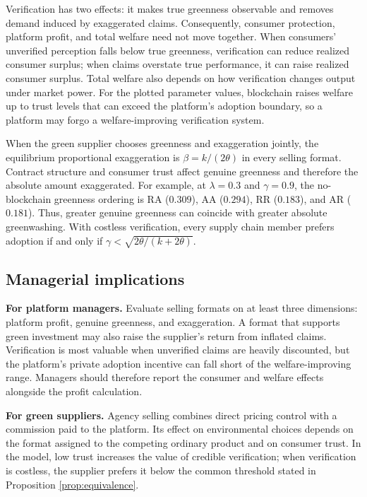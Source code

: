 \documentclass[preprint,review,12pt,authoryear,nopreprintline]{elsarticle}
\theoremstyle{definition}
\begin{document}
Verification has two effects: it makes true greenness observable and removes demand induced by exaggerated claims. Consequently, consumer protection, platform profit, and total welfare need not move together. When consumers' unverified perception falls below true greenness, verification can reduce realized consumer surplus; when claims overstate true performance, it can raise realized consumer surplus. Total welfare also depends on how verification changes output under market power. For the plotted parameter values, blockchain raises welfare up to trust levels that can exceed the platform's adoption boundary, so a platform may forgo a welfare-improving verification system.

When the green supplier chooses greenness and exaggeration jointly, the equilibrium proportional exaggeration is $\beta=k/(2\theta)$ in every selling format. Contract structure and consumer trust affect genuine greenness and therefore the absolute amount exaggerated. For example, at $\lambda=0.3$ and $\gamma=0.9$, the no-blockchain greenness ordering is RA ($0.309$), AA ($0.294$), RR ($0.183$), and AR ($0.181$). Thus, greater genuine greenness can coincide with greater absolute greenwashing. With costless verification, every supply chain member prefers adoption if and only if $\gamma<\sqrt{2\theta/(k+2\theta)}$.

\subsection{Managerial implications}

\textbf{For platform managers.} Evaluate selling formats on at least three dimensions: platform profit, genuine greenness, and exaggeration. A format that supports green investment may also raise the supplier's return from inflated claims. Verification is most valuable when unverified claims are heavily discounted, but the platform's private adoption incentive can fall short of the welfare-improving range. Managers should therefore report the consumer and welfare effects alongside the profit calculation.

\textbf{For green suppliers.} Agency selling combines direct pricing control with a commission paid to the platform. Its effect on environmental choices depends on the format assigned to the competing ordinary product and on consumer trust. In the model, low trust increases the value of credible verification; when verification is costless, the supplier prefers it below the common threshold stated in Proposition \ref{prop:equivalence}.
\end{document}
